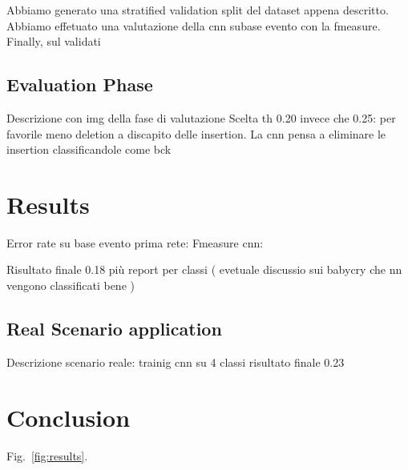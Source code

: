 \documentclass{article}
\begin{document}
\begin{sloppy}
Abbiamo generato una stratified validation split del dataset appena descritto. 
Abbiamo effetuato una valutazione della cnn subase evento con la fmeasure.
Finally, sul validati

\subsection{Evaluation Phase}
Descrizione con img della fase di valutazione
Scelta th 0.20 invece che 0.25: per favorile meno deletion a discapito delle insertion. La cnn pensa a eliminare le insertion classificandole come bck
\section{Results}
Error rate su base evento prima rete: 
Fmeasure cnn:

Risultato finale 0.18 più report per classi ( evetuale discussio sui babycry che nn vengono classificati bene )
\label{sec:typestyle}

\subsection{Real Scenario application}
Descrizione scenario reale: trainig cnn su 4 classi
risultato finale 0.23

\section{Conclusion}
\label{sec:majhead}


Fig.~\ref{fig:results}. 


\end{sloppy}
\end{document}
